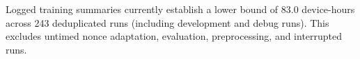 Logged training summaries currently establish a lower bound of 83.0 device-hours across 243 deduplicated runs (including development and debug runs). This excludes untimed nonce adaptation, evaluation, preprocessing, and interrupted runs.

